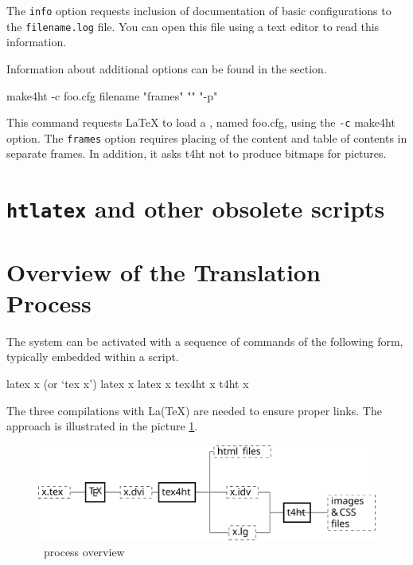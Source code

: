 The \texttt{info} option requests inclusion of documentation of basic configurations to the \texttt{filename.log} file.
You can open this file using a text editor to read this information.

Information about additional options can be found in the  section.


\begin{shellcommand}
make4ht -c foo.cfg filename "frames" "" "-p"
\end{shellcommand}

This command requests LaTeX to load a , named
foo.cfg, using the \texttt{-c} make4ht option. The \texttt{frames} option
requires placing of the content and table of contents in separate frames. In
addition, it asks t4ht not to produce bitmaps for pictures. 



\section{\texttt{htlatex} and other obsolete scripts}



\section{Overview of the Translation Process}\label{sec:overview}



The system can be activated with a sequence of commands of the following form, typically embedded within a script.

\begin{shellcommand}
latex      x            (or ‘tex x’) 
latex      x 
latex      x 
tex4ht     x 
t4ht       x 
\end{shellcommand}

The three compilations with La(TeX) are needed to ensure proper links. The approach is illustrated in the picture \ref{fig:process}. 

\begin{figure}
  \includegraphics[width=\textwidth]{images/tex4ht_process/tex4ht_process}
  \caption{\texfourht\ process overview}
  \label{fig:process}
\end{figure}

